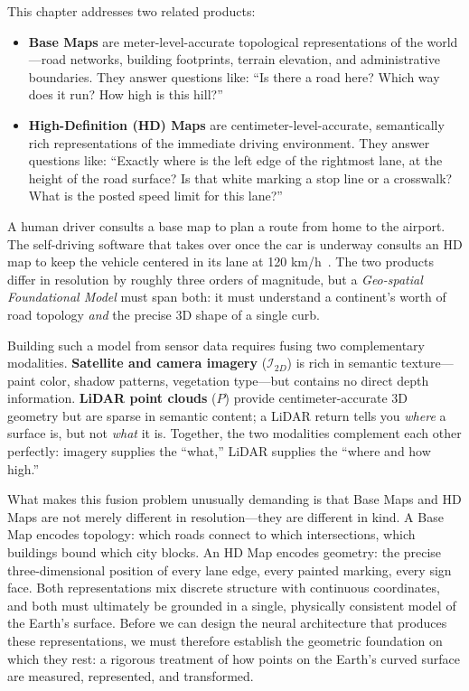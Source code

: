\documentclass{book}
\begin{document}
This chapter addresses two related products:

\begin{itemize}
\item \textbf{Base Maps} are meter-level-accurate topological
  representations of the world---road networks, building footprints,
  terrain elevation, and administrative boundaries.  They answer
  questions like: ``Is there a road here?  Which way does it run?
  How high is this hill?''

\item \textbf{High-Definition (HD) Maps} are centimeter-level-accurate,
  semantically rich representations of the immediate driving
  environment.  They answer questions like: ``Exactly where is the
  left edge of the rightmost lane, at the height of the road surface?
  Is that white marking a stop line or a crosswalk?  What is the
  posted speed limit for this lane?''
\end{itemize}

A human driver consults a base map to plan a route from home to the
airport.  The self-driving software that takes over once the car is
underway consults an HD map to keep the vehicle centered in its lane
at 120 km/h~\cite{caesar2020nuscenes,nuplan2023}.  The two products
differ in resolution by roughly three orders of magnitude, but a
\emph{Geo-spatial Foundational Model} must span both: it must
understand a continent's worth of road topology \emph{and} the
precise 3D shape of a single curb.

Building such a model from sensor data requires fusing two
complementary modalities.  \textbf{Satellite and camera imagery}
($\mathcal{I}_{2D}$) is rich in semantic texture---paint color, shadow
patterns, vegetation type---but contains no direct depth information.
\textbf{LiDAR point clouds} ($P$) provide centimeter-accurate 3D
geometry but are sparse in semantic content; a LiDAR return tells you
\emph{where} a surface is, but not \emph{what} it is.  Together, the
two modalities complement each other perfectly: imagery supplies the
``what,'' LiDAR supplies the ``where and how high.''

What makes this fusion problem unusually demanding is that Base Maps
and HD Maps are not merely different in resolution---they are
different in kind.  A Base Map encodes topology: which roads connect
to which intersections, which buildings bound which city blocks.  An
HD Map encodes geometry: the precise three-dimensional position of
every lane edge, every painted marking, every sign face.  Both
representations mix discrete structure with continuous coordinates,
and both must ultimately be grounded in a single, physically
consistent model of the Earth's surface.  Before we can design the
neural architecture that produces these representations, we must
therefore establish the geometric foundation on which they rest: a
rigorous treatment of how points on the Earth's curved surface are
measured, represented, and transformed.
\end{document}
